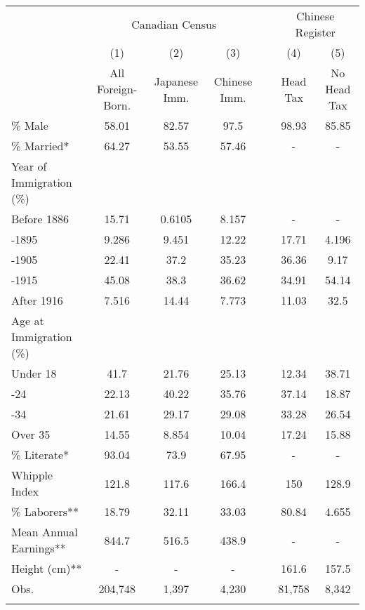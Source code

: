 \begin{tabular}{lcccccc}
\hhline{=======}
& \multicolumn{3}{c}{Canadian Census} & & \multicolumn{2}{c}{Chinese Register} \\ 
\hhline{~---~--}
& (1) & (2) & (3) & & (4) & (5) \\ 
& All Foreign-Born. & Japanese Imm. & Chinese Imm. & & Head Tax & No Head Tax \\ 
 \hhline{-------}
\% Male & 58.01&82.57& 97.5&&98.93&85.85 \\ 
\% Married* & 64.27&53.55&57.46&&-&- \\ 
Year of Immigration (\%)&&&&&&\\
\;\; Before 1886 & 15.71&0.6105&8.157&&-&- \\ 
\;\; 1886-1895 & 9.286&9.451&12.22&&17.71&4.196 \\ 
\;\; 1896-1905 & 22.41& 37.2&35.23&&36.36& 9.17 \\ 
\;\; 1906-1915 & 45.08& 38.3&36.62&&34.91&54.14 \\ 
\;\;After 1916 & 7.516&14.44&7.773&&11.03& 32.5 \\ 
Age at Immigration (\%)&&&&&&\\
\;\; Under 18 &  41.7&21.76&25.13&&12.34&38.71 \\ 
\;\; 18-24 & 22.13&40.22&35.76&&37.14&18.87 \\ 
\;\; 25-34 & 21.61&29.17&29.08&&33.28&26.54 \\ 
\;\; Over 35 & 14.55&8.854&10.04&&17.24&15.88 \\ 
\% Literate* & 93.04& 73.9&67.95&&-&- \\ 
Whipple Index & 121.8&117.6&166.4&&  150&128.9 \\ 
\% Laborers** & 18.79&32.11&33.03&&80.84&4.655 \\ 
Mean Annual Earnings** & 844.7&516.5&438.9&&-&- \\ 
Height (cm)** & -&-&-&&161.6&157.5 \\ 
Obs.
&
204,748&1,397&4,230&&81,758&8,342
\\ 
\hhline{-------}
\end{tabular}
